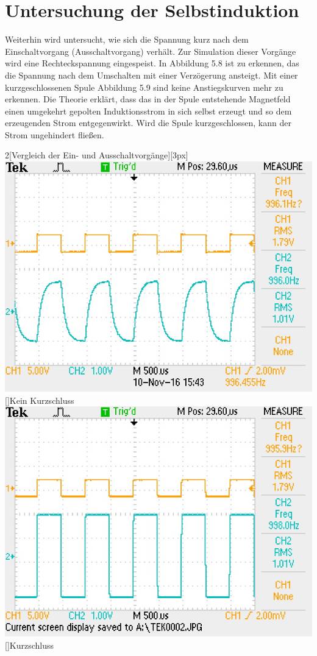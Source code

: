 \section{Untersuchung der Selbstinduktion}
  Weiterhin wird untersucht, wie sich die Spannung kurz nach dem Einschaltvorgang (Ausschaltvorgang) verhält. Zur Simulation dieser Vorgänge wird eine Rechteckspannung eingespeist. In Abbildung 5.8 ist zu erkennen, das die Spannung nach dem Umschalten mit einer Verzögerung ansteigt. Mit einer kurzgeschlossenen Spule Abbildung 5.9 sind keine Anstiegskurven mehr zu erkennen. Die Theorie erklärt, dass das in der Spule entstehende Magnetfeld einen umgekehrt gepolten Induktionsstrom in sich selbst erzeugt und so dem erzeugenden Strom entgegenwirkt. Wird die Spule kurzgeschlossen, kann der Strom ungehindert fließen.
\begin{multicols}{2}[Vergleich der Ein- und Ausschaltvorgänge][3px]
\includegraphics[scale=0.8]{Daten/ohneKurzschluss.JPG}
  []{Kein Kurzschluss} 
  \includegraphics[scale=0.8]{Daten/mitKurzschluss.JPG}
  []{Kurzschluss}
\end{multicols}
  
    \pagebreak
